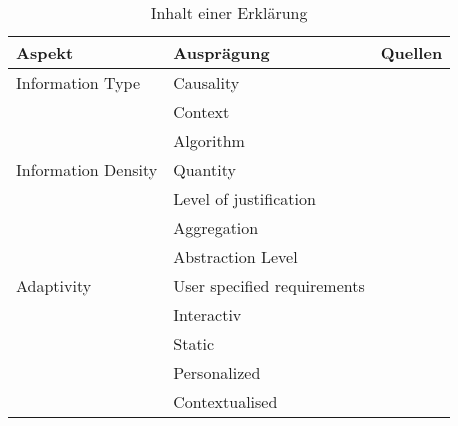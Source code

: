 \begin{table}[bht!]
    \begin{center}
        \begin{tabular}{|p{}|p{}|p{}|}
            \hline
            \textbf{Aspekt}    & \textbf{Ausprägung}   & \textbf{Quellen} \\ \hline
            Information Type    & Causality & \cite{chazette2020explainability} \cite{abdulrahman_belief-based_2019} \cite{yamada_evaluating_2016} \cite{sato_action-triggering_2019} \cite{zahedi_towards_2019} \cite{zahedi_towards_2019} \cite{zolotas_towards_2019} \cite{cassens_ambient_2019} \cite{thomson_knowledge--information_2020} \cite{chari_explanation_2020} \cite{neerincx_using_2018} \cite{nunes_systematic_2017}\cite{zhu_effects_2020} \cite{ribera2019can} \cite{lim_2009_assessing} \\
                                & Context & \cite{chazette2020explainability} \cite{zahedi_towards_2019} \cite{cassens_ambient_2019} \cite{zahedi_towards_2019} \cite{zolotas_towards_2019} \cite{chari_explanation_2020} \cite{nunes_systematic_2017} \cite{ribera2019can} \\
                                & Algorithm & \cite{chazette2020explainability} \cite{sato_action-triggering_2019} \cite{thomson_knowledge--information_2020} \cite{chari_explanation_2020} \cite{neerincx_using_2018} \cite{ribera2019can} \\
            \hline
            Information Density & Quantity & \cite{ribera2019can} \cite{kouki_user_2017} \\
                                & Level of justification & \cite{hernandez-bocanegra_effects_2020} \\
                                & Aggregation & \cite{hernandez-bocanegra_effects_2020} \cite{martin_developing_2019} \\
                                & Abstraction Level & \cite{thomson_knowledge--information_2020} \\
            \hline
            Adaptivity          & User specified requirements & \cite{tintarev_designing_nodate} \\
                                & Interactiv  & \cite{abdulrahman_belief-based_2019} \cite{cheng2019explaining} \\
                                & Static & \cite{abdulrahman_belief-based_2019} \\
                                & Personalized & \cite{kaptein_personalised_2017} \cite{cassens_ambient_2019}  \cite{sokol_one_2020} \\
                                & Contextualised & \cite{kaptein_personalised_2017} \cite{cassens_ambient_2019} \\
            \hline
        \end{tabular}
    \end{center}
    \caption{Inhalt einer Erklärung}
    \label{tab:content_of_explanations}
\end{table}

